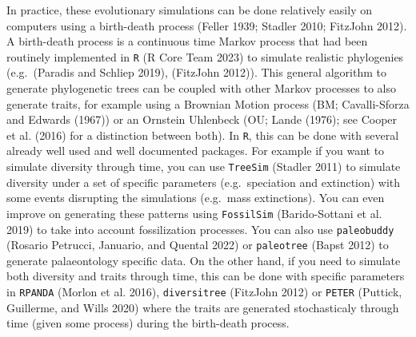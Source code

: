 \documentclass[
]{article}
\begin{document}
In practice, these evolutionary simulations can be done relatively
easily on computers using a birth-death process (Feller 1939; Stadler
2010; FitzJohn 2012). A birth-death process is a continuous time Markov
process that had been routinely implemented in \texttt{R} (R Core Team
2023) to simulate realistic phylogenies (e.g.~(Paradis and Schliep
2019), (FitzJohn 2012)). This general algorithm to generate phylogenetic
trees can be coupled with other Markov processes to also generate
traits, for example using a Brownian Motion process (BM; Cavalli-Sforza
and Edwards (1967)) or an Ornstein Uhlenbeck (OU; Lande (1976); see
Cooper et al. (2016) for a distinction between both). In \texttt{R},
this can be done with several already well used and well documented
packages. For example if you want to simulate diversity through time,
you can use \texttt{TreeSim} (Stadler 2011) to simulate diversity under
a set of specific parameters (e.g.~speciation and extinction) with some
events disrupting the simulations (e.g.~mass extinctions). You can even
improve on generating these patterns using \texttt{FossilSim}
(Barido-Sottani et al. 2019) to take into account fossilization
processes. You can also use \texttt{paleobuddy} (Rosario Petrucci,
Januario, and Quental 2022) or \texttt{paleotree} (Bapst 2012) to
generate palaeontology specific data. On the other hand, if you need to
simulate both diversity and traits through time, this can be done with
specific parameters in \texttt{RPANDA} (Morlon et al. 2016),
\texttt{diversitree} (FitzJohn 2012) or \texttt{PETER} (Puttick,
Guillerme, and Wills 2020) where the traits are generated stochasticaly
through time (given some process) during the birth-death process.
\end{document}

